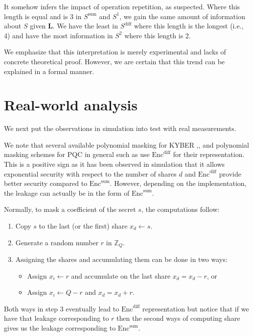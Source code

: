\documentclass{llncs}
\begin{document}
	It somehow infers the impact of operation repetition, as suspected. Where this length is equal and is 3 in $S^\text{sum}$ and $S^1 $, we gain the same amount of information about $S$ given $\bm{L}$. We have the least in $S^\text{diff}$ where this length is the longest (i.e., 4) and have the most information in $S^2$ where this length is 2.
	
	We emphasize that this interpretation is merely experimental and lacks of concrete theoretical proof. However, we are certain that this trend can be explained in a formal manner.
	\section{Real-world analysis}\label{sec:onm}
	We next put the observations in simulation into test with real measurements.
	
	We note that several available polynomial masking for KYBER \cite{Kmaskimp0},\cite{Kmaskimp1}, \cite{Kmaskimp2} and polynomial masking schemes for PQC in general such as \cite{Kmask1}  use $\text{Enc}^{\text{diff}}$ for their representation. This is a positive sign as it has been observed in simulation that it allows exponential security with respect to the number of shares $d$ and $\text{Enc}^{\text{diff}}$ provide better security compared to $\text{Enc}^{\text{sum}}$. However, depending on the implementation, the leakage can actually be in the form of $\text{Enc}^{\text{sum}}$. 
	
	Normally, to mask a coefficient of the secret $s$, the computations follow:
	\begin{enumerate}
		\item Copy $s$ to the last (or the first) share $x_d \leftarrow s$.
		\item Generate a random number $r$ in $\mathbb{Z}_Q$.
		\item Assigning the shares and accumulating them can be done in two ways:
		\begin{itemize}
			\item Assign $x_i \leftarrow r$ and accumulate on the last share $x_d = x_d - r$, or
			\item Assign $x_i \leftarrow Q - r$ and $x_d = x_d + r$.
		\end{itemize}
	\end{enumerate}
	Both ways in step 3 eventually lead to $\text{Enc}^{\text{diff}}$ representation but notice that if we have that leakage corresponding to $r$ then the second ways of computing share gives us the leakage corresponding to $\text{Enc}^{\text{sum}}$.
	
\end{document}
